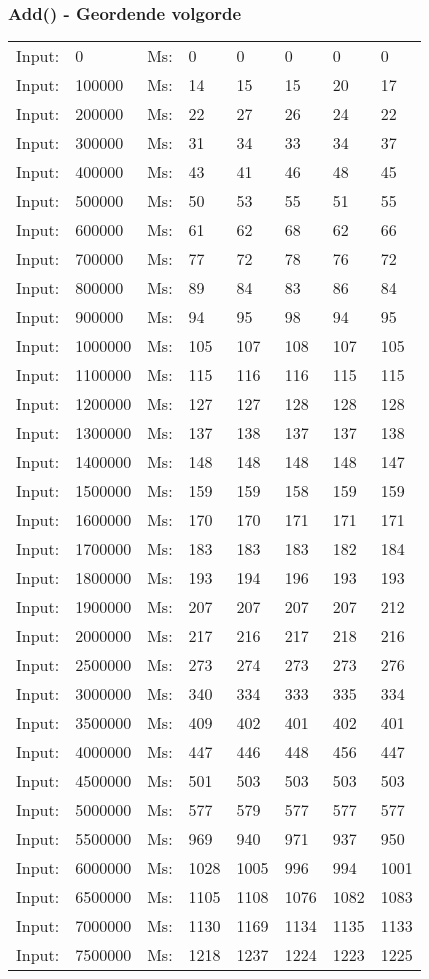 \documentclass[11pt,a4paper]{report}
\begin{document}
\begin{tiny}
\subsubsection*{Add() - Geordende volgorde}
\begin{tabular}{l l ||l  l  l  l  l  l}
Input:&0&Ms:&0&0&0&0&0\\
Input:&100000&Ms:&14&15&15&20&17\\
Input:&200000&Ms:&22&27&26&24&22\\
Input:&300000&Ms:&31&34&33&34&37\\
Input:&400000&Ms:&43&41&46&48&45\\
Input:&500000&Ms:&50&53&55&51&55\\
Input:&600000&Ms:&61&62&68&62&66\\
Input:&700000&Ms:&77&72&78&76&72\\
Input:&800000&Ms:&89&84&83&86&84\\
Input:&900000&Ms:&94&95&98&94&95\\
Input:&1000000&Ms:&105&107&108&107&105\\
Input:&1100000&Ms:&115&116&116&115&115\\
Input:&1200000&Ms:&127&127&128&128&128\\
Input:&1300000&Ms:&137&138&137&137&138\\
Input:&1400000&Ms:&148&148&148&148&147\\
Input:&1500000&Ms:&159&159&158&159&159\\
Input:&1600000&Ms:&170&170&171&171&171\\
Input:&1700000&Ms:&183&183&183&182&184\\
Input:&1800000&Ms:&193&194&196&193&193\\
Input:&1900000&Ms:&207&207&207&207&212\\
Input:&2000000&Ms:&217&216&217&218&216\\
Input:&2500000&Ms:&273&274&273&273&276\\
Input:&3000000&Ms:&340&334&333&335&334\\
Input:&3500000&Ms:&409&402&401&402&401\\
Input:&4000000&Ms:&447&446&448&456&447\\
Input:&4500000&Ms:&501&503&503&503&503\\
Input:&5000000&Ms:&577&579&577&577&577\\
Input:&5500000&Ms:&969&940&971&937&950\\
Input:&6000000&Ms:&1028&1005&996&994&1001\\
Input:&6500000&Ms:&1105&1108&1076&1082&1083\\
Input:&7000000&Ms:&1130&1169&1134&1135&1133\\
Input:&7500000&Ms:&1218&1237&1224&1223&1225\\
\end{tabular}


\end{tiny}
\end{document}
